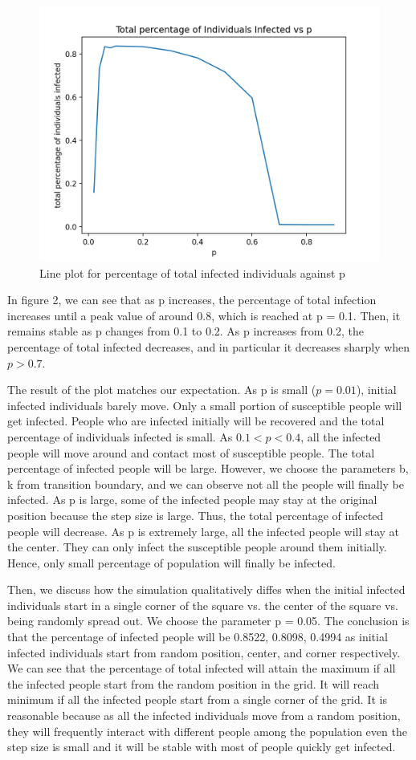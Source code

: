 \documentclass{article}
\begin{document}
\begin{figure}[htp]
\centering
\includegraphics[width=.3\textwidth]{improve2.png}
\caption{Line plot for percentage of total infected individuals against p}
\label{fig:figure2}

\end{figure}


In figure 2, we can see that as p increases, the percentage of total infection increases until a peak value of around 0.8, which is reached at p = 0.1. Then, it remains stable as p changes from 0.1 to 0.2. As p increases from 0.2, the percentage of total infected decreases, and in particular it decreases sharply when $p > 0.7$. 

The result of the plot matches our expectation. As p is small ($p=0.01$), initial infected individuals barely move. Only a small portion of susceptible people will get infected. People who are infected initially will be recovered and the total percentage of individuals infected is small. As $ 0.1<p<0.4 $, all the infected people will move around and contact most of susceptible people. The total percentage of infected people will be large. However, we choose the parameters b, k from transition boundary, and we can observe not all the people will finally be infected. As p is large, some of the infected people may stay at the original position because the step size is large. Thus, the total percentage of infected people will decrease. As p is extremely large, all the infected people will stay at the center. They can only infect the susceptible people around them initially. Hence, only small percentage of population will finally be infected. 


Then, we discuss how the simulation qualitatively diffes when the initial infected individuals start in a single corner of the square vs. the center of the square vs. being randomly spread out. We choose the parameter p = 0.05. The conclusion is that the percentage of infected people will be 0.8522, 0.8098, 0.4994 as initial infected individuals start from random position, center, and corner respectively. We can see that the percentage of total infected will attain the maximum if all the infected people start from the random position in the grid. It will reach minimum if all the infected people start from a single corner of the grid. It is reasonable because as all the infected individuals move from a random position, they will frequently interact with different people among the population even the step size is small and it will be stable with most of people quickly get infected.
\end{document}

